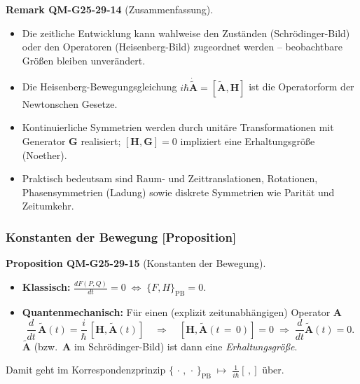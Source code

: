 \documentclass[10pt, letterpaper]{article}
\newcommand{\CustomHeading}[3]{%
  \par\medskip\noindent%
  \textbf{#1 #2} \textnormal{(#3)}.\enskip%
}
\newenvironment{PROP}[2]{\begin{unitbox}\CustomHeading{Proposition}{#1}{#2}}{\end{unitbox}}
\newenvironment{REM}[2]{\begin{unitbox}\CustomHeading{Remark}{#1}{#2}}{\end{unitbox}}
\begin{document}
\begin{REM}{QM-G25-29-14}{Zusammenfassung}
\begin{itemize}
\item Die zeitliche Entwicklung kann wahlweise den Zuständen
      (Schrödinger-Bild) oder den Operatoren
      (Heisenberg-Bild) zugeordnet werden – beobachtbare Größen bleiben
      unverändert.
\item Die Heisenberg-Bewegungsgleichung
      \(i\hbar\dot{\tilde{\mathbf A}}=[\tilde{\mathbf A},\mathbf H]\)
      ist die Operatorform der Newtonschen Gesetze.
\item Kontinuierliche Symmetrien werden durch unitäre
      Transformationen mit Generator $\mathbf G$ realisiert;  
      \([\mathbf H,\mathbf G]=0\) impliziert eine
      Erhaltungsgröße (Noether).
\item Praktisch bedeutsam sind Raum- und Zeittranslationen,
      Rotationen, Phasensymmetrien (Ladung) sowie diskrete
      Symmetrien wie Parität und Zeitumkehr.
\end{itemize}
\end{REM}


\subsubsection*{Konstanten der Bewegung [Proposition]}

\begin{PROP}{QM-G25-29-15}{Konstanten der Bewegung}
\begin{itemize}
\item \textbf{Klassisch:}  
      $\displaystyle \frac{dF(P,Q)}{dt}=0 
      \;\Longleftrightarrow\;
      \{F,H\}_{\text{PB}}=0$.

\item \textbf{Quantenmechanisch:}  
      Für einen (explizit zeitunabhängigen) Operator $\mathbf A$
      \[
        \frac{d}{dt}\,\tilde{\mathbf A}(t)=
        \frac{i}{\hbar}\,[\mathbf H,\tilde{\mathbf A}(t)]
        \quad\Longrightarrow\quad
        [\mathbf H,\tilde{\mathbf A}(t\,{=}\,0)]=0
        \;\Rightarrow\;
        \frac{d}{dt}\tilde{\mathbf A}(t)=0 .
      \]
      $\tilde{\mathbf A}$ (bzw.\ $\mathbf A$ im Schrödinger-Bild) ist dann
      eine \emph{Erhaltungsgröße}.
\end{itemize}

Damit geht im Korrespondenzprinzip  
$\{\,\cdot\,,\,\cdot\,\}_{\text{PB}}\;\mapsto\;
\frac{1}{i\hbar}[\,,]$ über.
\end{PROP}
\end{document}
